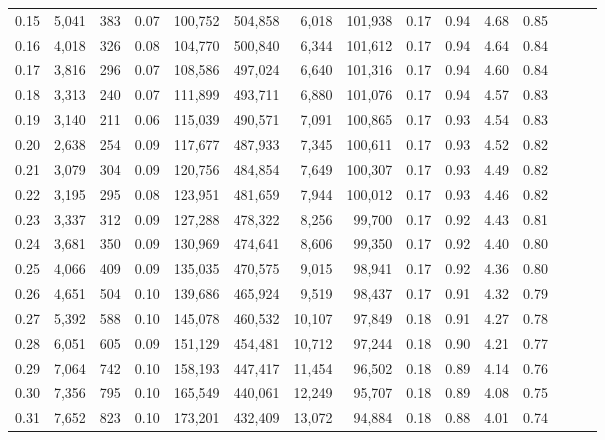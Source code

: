 \begin{tabular}{rrrrrrrrrrrrrrr}
0.15 &   5,041 &    383 &  0.07 &  100,752 &  504,858 &    6,018 &  101,938 &  0.17 &  0.94 &  4.68 &      0.85 \\
0.16 &   4,018 &    326 &  0.08 &  104,770 &  500,840 &    6,344 &  101,612 &  0.17 &  0.94 &  4.64 &      0.84 \\
0.17 &   3,816 &    296 &  0.07 &  108,586 &  497,024 &    6,640 &  101,316 &  0.17 &  0.94 &  4.60 &      0.84 \\
0.18 &   3,313 &    240 &  0.07 &  111,899 &  493,711 &    6,880 &  101,076 &  0.17 &  0.94 &  4.57 &      0.83 \\
0.19 &   3,140 &    211 &  0.06 &  115,039 &  490,571 &    7,091 &  100,865 &  0.17 &  0.93 &  4.54 &      0.83 \\
0.20 &   2,638 &    254 &  0.09 &  117,677 &  487,933 &    7,345 &  100,611 &  0.17 &  0.93 &  4.52 &      0.82 \\
0.21 &   3,079 &    304 &  0.09 &  120,756 &  484,854 &    7,649 &  100,307 &  0.17 &  0.93 &  4.49 &      0.82 \\
0.22 &   3,195 &    295 &  0.08 &  123,951 &  481,659 &    7,944 &  100,012 &  0.17 &  0.93 &  4.46 &      0.82 \\
0.23 &   3,337 &    312 &  0.09 &  127,288 &  478,322 &    8,256 &   99,700 &  0.17 &  0.92 &  4.43 &      0.81 \\
0.24 &   3,681 &    350 &  0.09 &  130,969 &  474,641 &    8,606 &   99,350 &  0.17 &  0.92 &  4.40 &      0.80 \\
0.25 &   4,066 &    409 &  0.09 &  135,035 &  470,575 &    9,015 &   98,941 &  0.17 &  0.92 &  4.36 &      0.80 \\
0.26 &   4,651 &    504 &  0.10 &  139,686 &  465,924 &    9,519 &   98,437 &  0.17 &  0.91 &  4.32 &      0.79 \\
0.27 &   5,392 &    588 &  0.10 &  145,078 &  460,532 &   10,107 &   97,849 &  0.18 &  0.91 &  4.27 &      0.78 \\
0.28 &   6,051 &    605 &  0.09 &  151,129 &  454,481 &   10,712 &   97,244 &  0.18 &  0.90 &  4.21 &      0.77 \\
0.29 &   7,064 &    742 &  0.10 &  158,193 &  447,417 &   11,454 &   96,502 &  0.18 &  0.89 &  4.14 &      0.76 \\
0.30 &   7,356 &    795 &  0.10 &  165,549 &  440,061 &   12,249 &   95,707 &  0.18 &  0.89 &  4.08 &      0.75 \\
0.31 &   7,652 &    823 &  0.10 &  173,201 &  432,409 &   13,072 &   94,884 &  0.18 &  0.88 &  4.01 &      0.74 \\

\end{tabular}
